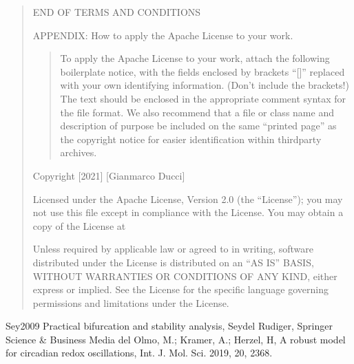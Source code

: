 \documentclass[letterpaper,10pt,english,openany,oneside]{sphinxmanual}
\begin{document}
\begin{quote}
\begin{enumerate}
\end{enumerate}

END OF TERMS AND CONDITIONS

APPENDIX: How to apply the Apache License to your work.
\begin{quote}

To apply the Apache License to your work, attach the following
boilerplate notice, with the fields enclosed by brackets “{[}{]}”
replaced with your own identifying information. (Don’t include
the brackets!)  The text should be enclosed in the appropriate
comment syntax for the file format. We also recommend that a
file or class name and description of purpose be included on the
same “printed page” as the copyright notice for easier
identification within third\sphinxhyphen{}party archives.
\end{quote}

Copyright {[}2021{]} {[}Gianmarco Ducci{]}

Licensed under the Apache License, Version 2.0 (the “License”);
you may not use this file except in compliance with the License.
You may obtain a copy of the License at
\begin{quote}

\end{quote}

Unless required by applicable law or agreed to in writing, software
distributed under the License is distributed on an “AS IS” BASIS,
WITHOUT WARRANTIES OR CONDITIONS OF ANY KIND, either express or implied.
See the License for the specific language governing permissions and
limitations under the License.
\end{quote}

\begin{sphinxthebibliography}{Sey2009}
Practical bifurcation and stability analysis, Seydel Rudiger, Springer Science \& Business Media
del Olmo, M.; Kramer, A.; Herzel, H, A robust model for circadian redox oscillations, Int. J. Mol. Sci. 2019, 20, 2368.
\end{sphinxthebibliography}


\renewcommand{\indexname}{Python Module Index}
\begin{sphinxtheindex}
\let\bigletter\sphinxstyleindexlettergroup
\bigletter{.}
\item\relax{}
\end{sphinxtheindex}

\renewcommand{\indexname}{Index}
\printindex
\end{document}
